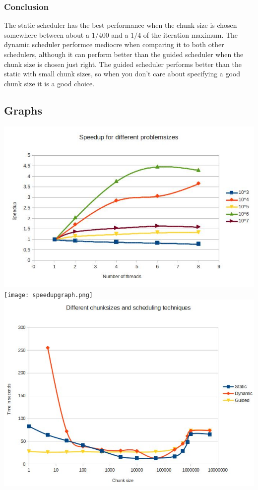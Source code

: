 \documentclass[12pt]{article}
\begin{document}
\subsubsection{Conclusion}
The static scheduler has the best performance when the chunk size is chosen
somewhere between about a $1/400$ and a $1/4$ of the iteration maximum. The
dynamic scheduler performce mediocre when comparing it to both other
schedulers, although it can perform better than the guided scheduler when the
chunk size is chosen just right. The guided scheduler performs better than the
static with small chunk sizes, so when you don't care about specifying a good
chunk size it is a good choice.

\clearpage
\subsection{Graphs}
\includegraphics[width=\textwidth]{threads.jpg}
\texttt{[image: speedupgraph.png]}
\includegraphics[width=\textwidth]{chunks.jpg}
\end{document}

